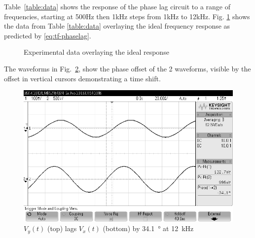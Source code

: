 Table~\ref{table:data} shows the response of the phase lag circuit to a range of frequencies, starting at 500\si{\hertz} then 1\si{\kilo\hertz} steps from 1\si{\kilo\hertz} to 12\si{\kilo\hertz}.
Fig. \ref{fig:freq-response} shows the data from Table \ref{table:data} overlaying the ideal frequency response as predicted by \eqref{eq:tf-phaselag}.

\begin{figure}[htpb]
	\centering
	\label{fig:freq-response}
	\caption{Experimental data overlaying the ideal response}
\end{figure}

The waveforms in Fig.~\ref{fig:scope}, show the phase offset of the 2 waveforms, visible by the offset in vertical cursors demonstrating a time shift.

\begin{figure}[tbph]
	\centering
	\includegraphics[width=0.65\linewidth]{graphics/12khz_phase_lag}
	\caption{$V_y(t)$ (top) lags $V_x(t)$ (bottom) by \SI{34.1}{\degree} at \SI{12}{\kilo\hertz}}
	\label{fig:scope}
\end{figure}
